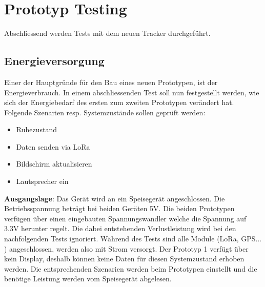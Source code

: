 \documentclass[11pt,english,german]{report}
\theoremstyle{definition}
\begin{document}
\newpage
\section{Prototyp Testing}
Abschliessend werden Tests mit dem neuen Tracker durchgeführt.

\subsection{Energieversorgung}
Einer der Hauptgründe für den Bau eines neuen Prototypen, ist der Energieverbrauch. In einem abschliessenden Test soll nun festgestellt werden, wie sich der Energiebedarf des ersten zum zweiten Prototypen verändert hat. Folgende Szenarien resp. Systemzustände sollen geprüft werden:
\begin{itemize}
	\item Ruhezustand
	\item Daten senden via LoRa
	\item Bildschirm aktualisieren
	\item Lautsprecher ein	
\end{itemize}
\textbf{Ausgangslage}: Das Gerät wird an ein Speisegerät angeschlossen. Die Betriebsspannung beträgt bei beiden Geräten 5V. Die beiden Prototypen verfügen über einen eingebauten Spannungswandler welche die Spannung auf 3.3V herunter regelt. Die dabei entstehenden Verlustleistung wird bei den nachfolgenden Tests ignoriert. Während des Tests sind alle Module (LoRa, GPS... ) angeschlossen, werden also mit Strom versorgt. Der Prototyp 1 verfügt über kein Display, deshalb können keine Daten für diesen Systemzustand erhoben werden. Die entsprechenden Szenarien werden beim Prototypen einstellt und die benötige Leistung werden vom Speisegerät abgelesen.
\end{document}
